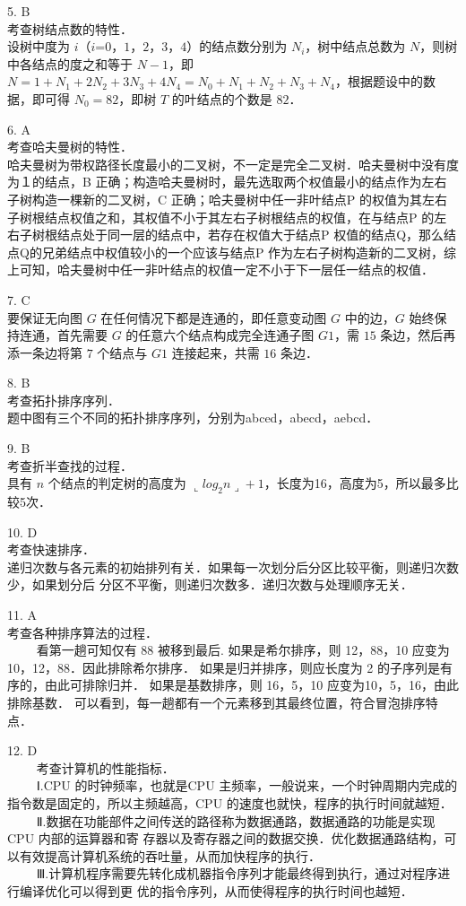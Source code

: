 5. B \\
考查树结点数的特性． \\
设树中度为 $i$（$i$=$0$，$1$，$2$，$3$，$4$）的结点数分别为 $N_i$，树中结点总数为 $N$，则树中各结点的度之和等于 $N-1$，即 $N=1+N_1+2N_2+3N_3+4N_4=N_0+N_1+N_2+N_3+N_4$，根据题设中的数据，即可得 $N_0=82$，即树 $T$ 的叶结点的个数是 $82$．

6. A \\
考查哈夫曼树的特性． \\
哈夫曼树为带权路径长度最小的二叉树，不一定是完全二叉树．哈夫曼树中没有度为１的结点，B 正确；构造哈夫曼树时，最先选取两个权值最小的结点作为左右子树构造一棵新的二叉树，C 正确；哈夫曼树中任一非叶结点P 的权值为其左右子树根结点权值之和，其权值不小于其左右子树根结点的权值，在与结点P 的左右子树根结点处于同一层的结点中，若存在权值大于结点P 权值的结点Q，那么结点Q的兄弟结点中权值较小的一个应该与结点P 作为左右子树构造新的二叉树，综上可知，哈夫曼树中任一非叶结点的权值一定不小于下一层任一结点的权值．

7. C \\
要保证无向图 $G$ 在任何情况下都是连通的，即任意变动图 $G$ 中的边，$G$ 始终保持连通，首先需要 $G$ 的任意六个结点构成完全连通子图 $G1$，需 $15$ 条边，然后再添一条边将第 $7$ 个结点与 $G1$ 连接起来，共需 $16$ 条边．

8. B \\
考查拓扑排序序列． \\
题中图有三个不同的拓扑排序序列，分别为abced，abecd，aebcd．

9. B \\
考查折半查找的过程． \\
具有 $n$ 个结点的判定树的高度为 $\llcorner log_2n\lrcorner+1$，长度为16，高度为5，所以最多比较5次．

10. D \\
考查快速排序． \\
递归次数与各元素的初始排列有关．如果每一次划分后分区比较平衡，则递归次数少，如果划分后
分区不平衡，则递归次数多．递归次数与处理顺序无关．

11. A \\
考查各种排序算法的过程．\\
$\qquad$ 看第一趟可知仅有 88 被移到最后.
如果是希尔排序，则 12，88，10 应变为10，12，88．因此排除希尔排序．
如果是归并排序，则应长度为 2 的子序列是有序的，由此可排除归并．
如果是基数排序，则 16，5，10 应变为10，5，16，由此排除基数．
可以看到，每一趟都有一个元素移到其最终位置，符合冒泡排序特点．

12. D \\
$\qquad$ 考查计算机的性能指标．\\
$\qquad$ Ⅰ.CPU 的时钟频率，也就是CPU 主频率，一般说来，一个时钟周期内完成的指令数是固定的，所以主频越高，CPU 的速度也就快，程序的执行时间就越短．\\
$\qquad$ Ⅱ.数据在功能部件之间传送的路径称为数据通路，数据通路的功能是实现CPU 内部的运算器和寄
存器以及寄存器之间的数据交换．优化数据通路结构，可以有效提高计算机系统的吞吐量，从而加快程序的执行．\\
$\qquad$ Ⅲ.计算机程序需要先转化成机器指令序列才能最终得到执行，通过对程序进行编译优化可以得到更
优的指令序列，从而使得程序的执行时间也越短．

